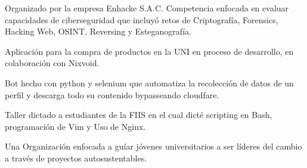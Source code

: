 


Organizado por la empresa Enhacke S.A.C. Competencia enfocada en evaluar capacidades de ciberseguridad que incluyó
retos de Criptografía, Forensics, Hacking Web, OSINT, Reversing y Esteganografía.




Aplicación para la compra de productos en la UNI en proceso
de desarrollo, en colaboración con Nixvoid.

\divider


Bot hecho con python y selenium que automatiza la recolección de datos de un perfil y descarga todo su contenido bypasseando cloudfare.

\divider


Taller dictado a estudiantes de la FIIS en el cual dicté scripting
en Bash, programación de Vim y Uso de Nginx.




\medskip
{} 



Una Organización enfocada a guíar jóvenes universitarios a ser
líderes del cambio a través de proyectos autosustentables.